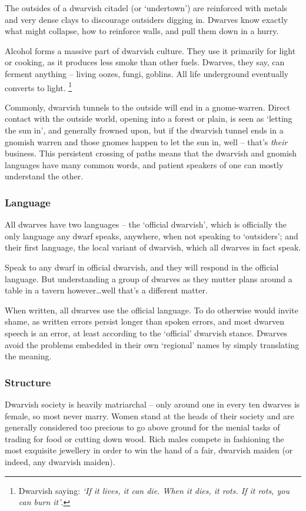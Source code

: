 \begin{multicols}{2}
The outsides of a dwarvish citadel (or `undertown') are reinforced with metals and very dense clays to discourage outsiders digging in.
Dwarves know exactly what might collapse, how to reinforce walls, and pull them down in a hurry.

Alcohol forms a massive part of dwarvish culture.
They use it primarily for light or cooking, as it produces less smoke than other fuels.
Dwarves, they say, can ferment anything -- living oozes, fungi, goblins.
All life underground eventually converts to light.%
\footnote{Dwarvish saying: \textit{`If it lives, it can die. When it dies, it rots. If it rots, you can burn it'}.}

Commonly, dwarvish tunnels to the outside will end in a gnome-warren.
Direct contact with the outside world, opening into a forest or plain, is seen as `letting the sun in',
and generally frowned upon, but if the dwarvish tunnel ends in a gnomish warren and those gnomes happen to let the sun in, well -- that's \emph{their} business.
This persistent crossing of paths means that the dwarvish and gnomish languages have many common words, and patient speakers of one can mostly understand the other.

\subsubsection{Language}

All dwarves have two languages -- the `official dwarvish', which is officially the only language any dwarf speaks, anywhere, when not speaking to `outsiders'; and their first language, the local variant of dwarvish, which all dwarves in fact speak.

Speak to any dwarf in official dwarvish, and they will respond in the official language.
But understanding a group of dwarves as they mutter plans around a table in a tavern however\ldots well that's a different matter.

When written, all dwarves use the official language.
To do otherwise would invite shame, as written errors persist longer than spoken errors, and most dwarven speech is an error, at least according to the `official' dwarvish stance.
Dwarves avoid the problems embedded in their own `regional' names by simply translating the meaning.


\subsubsection{Structure}
\label{dwarven_structure}
Dwarvish society is heavily matriarchal -- only around one in every ten dwarves is female, so most never marry.
Women stand at the heads of their society and are generally considered too precious to go above ground for the menial tasks of trading for food or cutting down wood.
Rich males compete in fashioning the most exquisite jewellery in order to win the hand of a fair, dwarvish maiden (or indeed, any dwarvish maiden).


\end{multicols}
